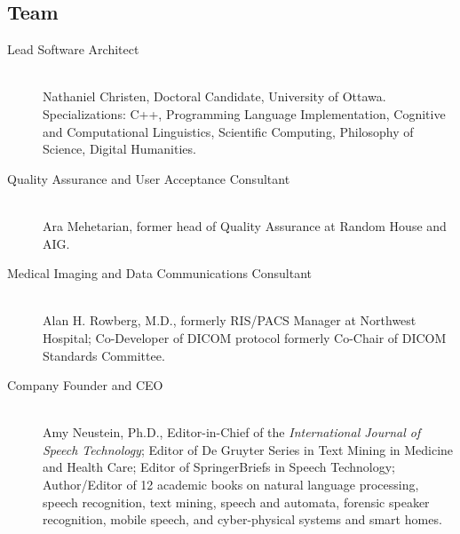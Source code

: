 
\begin{frame}{}
\section{Team}


\begin{center}
\begin{minipage}{0.94\textwidth}
{\LARGE \setlength{\leftmargini}{3pt}\begin{description}
\item[Lead Software Architect]  {\llsep} \\Nathaniel Christen, Doctoral Candidate, University of Ottawa.  
Specializations: C++, Programming Language 
Implementation, Cognitive and Computational 
Linguistics, Scientific Computing, Philosophy 
of Science, Digital Humanities.{\thrule}
\item[Quality Assurance and User Acceptance 
Consultant]  {\llsep} \\Ara Mehetarian, 
former head of Quality Assurance at Random House and AIG.{\thrule}
\item[Medical Imaging and Data Communications Consultant]  {\llsep} \\Alan H. Rowberg, M.D., formerly
RIS/PACS Manager at Northwest Hospital; Co-Developer of DICOM protocol formerly Co-Chair
of DICOM Standards Committee.{\thrule}
\item[Company Founder and CEO]  {\llsep} \\Amy Neustein, Ph.D., Editor-in-Chief of the \textit{International Journal of
Speech Technology}; Editor of De Gruyter Series in Text Mining in Medicine and Health Care;
Editor of SpringerBriefs in Speech Technology; Author/Editor of 12 academic books on 
natural language processing, speech recognition, 
text mining, speech and
automata, forensic speaker recognition, 
mobile speech, and cyber-physical systems 
and smart homes.\vspace{1em}  
\end{description}}
\end{minipage}
\end{center}


\end{frame}
